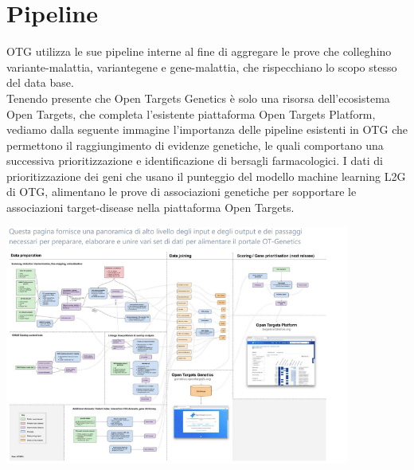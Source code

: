 \documentclass{article}
\begin{document}
\section{Pipeline}
OTG utilizza le sue pipeline interne al fine di aggregare le prove che colleghino variante-malattia, variantegene e gene-malattia, che rispecchiano lo scopo stesso del data base.\\
Tenendo presente che Open Targets Genetics è solo una risorsa dell'ecosistema Open Targets, che
completa l'esistente piattaforma Open Targets Platform, vediamo dalla seguente immagine l'importanza
delle pipeline esistenti in OTG che permettono il raggiungimento di evidenze genetiche, le quali
comportano una successiva prioritizzazione e identificazione di bersagli farmacologici. I dati di
prioritizzazione dei geni che usano il punteggio del modello machine learning L2G di OTG, alimentano le
prove di associazioni genetiche per sopportare le associazioni target-disease nella piattaforma Open
Targets. 
\begin{center}
    \includegraphics[width=0.85\textwidth]{figures/pipelines.png}
\end{center}
\end{document}

